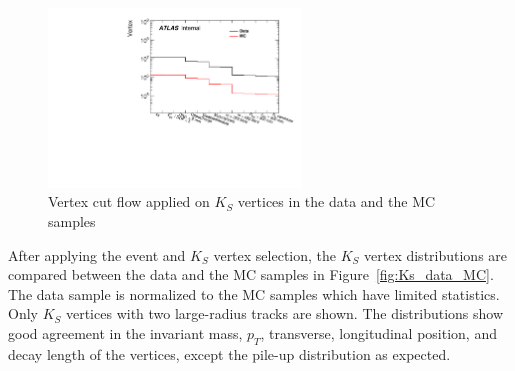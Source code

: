 \begin{figure}[!htb]
	\includegraphics[width=0.60\textwidth]{figures/m_syst_Ks_cf.pdf}
	\centering
	\caption{Vertex cut flow applied on $K_{S}$ vertices in the data and the MC samples}
	\label{fig:Ks_vertex_cutflow}
\end{figure}

After applying the event and $K_{S}$ vertex selection, the $K_{S}$ vertex distributions are compared between the data and the MC samples in Figure~\ref{fig:Ks_data_MC}. The data sample is normalized to the MC samples which have limited statistics. Only $K_{S}$ vertices with two large-radius tracks are shown. The distributions show good agreement in the invariant mass, $p_{T}$, transverse, longitudinal position, and decay length of the vertices, except the pile-up distribution as expected.


